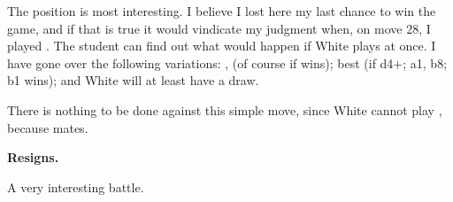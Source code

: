 \documentclass[10pt,twoside]{article}
\begin{document}

\board


The position is most interesting. I believe I lost here my last chance to win the game, and if that is true it would vindicate my judgment when, on move 28, I played . The student can find out what would happen if White plays  at once. I have gone over the following variations: ,  (of course if  wins);  best (if \figQ d4+; \figK a1, \figK b8; \figR b1 wins);  and White will at least have a draw.


There is nothing to be done against this simple move, since White cannot play , because  mates.


\noindent\textbf{Resigns.}

A very interesting battle.
\end{document}
